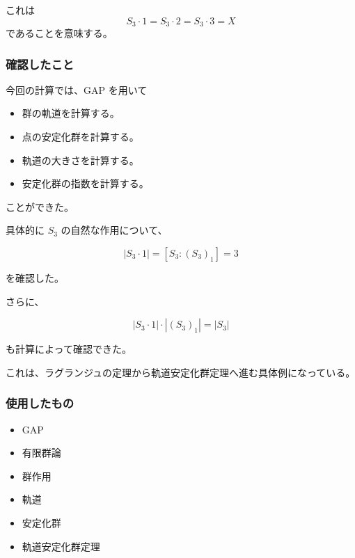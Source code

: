 これは
\[
S_3\cdot1
=
S_3\cdot2
=
S_3\cdot3
=
X
\]
であることを意味する。







\subsubsection{確認したこと}

今回の計算では、GAP を用いて

\begin{itemize}
  \item 群の軌道を計算する。
  \item 点の安定化群を計算する。
  \item 軌道の大きさを計算する。
  \item 安定化群の指数を計算する。
\end{itemize}

ことができた。

具体的に $S_3$ の自然な作用について、

\[
|S_3\cdot1|
=
[S_3:(S_3)_1]
=
3
\]

を確認した。

さらに、

\[
|S_3\cdot1|\cdot|(S_3)_1|
=
|S_3|
\]

も計算によって確認できた。

これは、ラグランジュの定理から軌道安定化群定理へ進む具体例になっている。

\subsubsection{使用したもの}

\begin{itemize}
  \item GAP
  \item 有限群論
  \item 群作用
  \item 軌道
  \item 安定化群
  \item 軌道安定化群定理
\end{itemize}